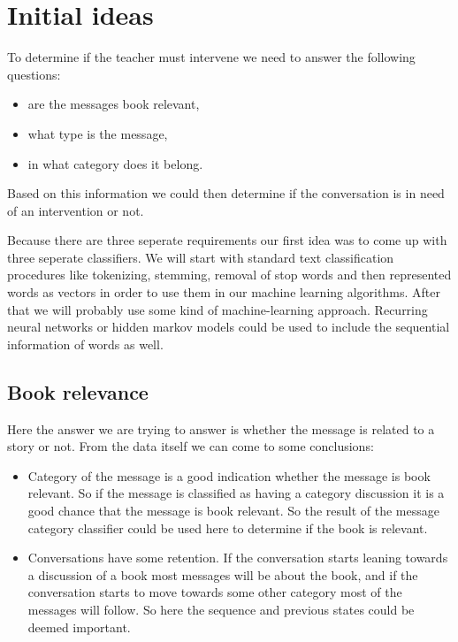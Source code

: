 \documentclass[11pt,a4paper]{article}
\begin{document}
\section{Initial ideas}

To determine if the teacher must intervene we need to answer the following questions:
\begin{itemize}
\item{are the messages book relevant,}
\item{what type is the message,}
\item{in what category does it belong.}
\end{itemize}

Based on this information we could then determine if the conversation is in need of an intervention or not.

Because there are three seperate requirements our first idea was to come up with three seperate classifiers.
We will start with standard text classification procedures like tokenizing, stemming, removal of stop words and then represented words as vectors in order to use them in our machine learning algorithms.
After that we will probably use some kind of machine-learning approach. 
Recurring neural networks or hidden markov models could be used to include the sequential information of words as well.

\subsection{Book relevance}
Here the answer we are trying to answer is whether the message is related to a story or not.
From the data itself we can come to some conclusions:

\begin{itemize}
\item{Category of the message is a good indication whether the message is book relevant. 
So if the message is classified as having a category discussion it is a good chance that the message is book relevant.
So the result of the message category classifier could be used here to determine if the book is relevant.}
\item{Conversations have some retention.
If the conversation starts leaning towards a discussion of a book most messages will be about the book, and if the conversation starts to move towards some other category most of the messages will follow.
 So here the sequence and previous states could be deemed important.}
\end{itemize}
\end{document}
